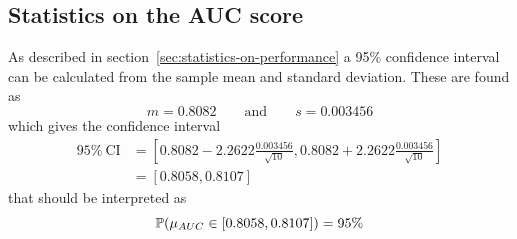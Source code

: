 \subsection{Statistics on the AUC score}
As described in section~\ref{sec:statistics-on-performance} a 95\% confidence interval can be calculated from the sample mean and standard deviation. These are found as
\[
    m = 0.8082 \quad\quad\text{and}\quad\quad s = 0.003456
\]
which gives the confidence interval
\begin{align*}
    95\%\:\text{CI} &= [0.8082-2.2622\frac{0.003456}{\sqrt{10}}, 0.8082+2.2622\frac{0.003456}{\sqrt{10}}]\\
    &= [0.8058, 0.8107]
\end{align*}
that should be interpreted as 
\[
    \mathbb{P}(\mu_{AUC} \in [0.8058, 0.8107]) = 95\%
\]
